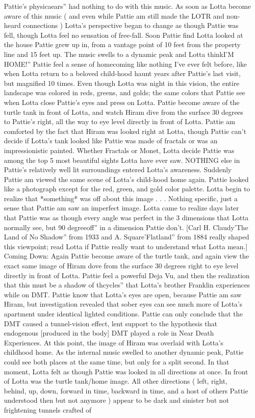 \documentclass[12pt]{book}
\begin{document}
Pattie's physicaears'' had nothing to do with this music. As soon as Lotta become aware of this music ( and even while Pattie am still made the LOTR and non-heard connections ) Lotta's perspective began to change as though Pattie was fell, though Lotta feel no sensation of free-fall. Soon Pattie find Lotta looked at the house Pattie grew up in, from a vantage point of 10 feet from the property line and 15 feet up. The music swells to a dynamic peak and Lotta thinkI'M HOME!'' Pattie feel a sense of homecoming like nothing I've ever felt before, like when Lotta return to a beloved child-hood haunt years after Pattie's last visit, but magnified 10 times. Even though Lotta was night in this vision, the entire landscape was colored in reds, greens, and golds; the same colors that Pattie see when Lotta close Pattie's eyes and press on Lotta. Pattie become aware of the turtle tank in front of Lotta, and watch Hiram dive from the surface 30 degrees to Pattie's right, all the way to eye level directly in front of Lotta. Pattie am comforted by the fact that Hiram was looked right at Lotta, though Pattie can't decide if Lotta's tank looked like Pattie was made of fractals or was an impressionistic painted. Whether Fractals or Monet, Lotta decide Pattie was among the top 5 most beautiful sights Lotta have ever saw. NOTHING else in Pattie's relatively well lit surroundings entered Lotta's awareness. Suddenly Pattie am viewed the same scene of Lotta's child-hood home again. Pattie looked like a photograph except for the red, green, and gold color palette. Lotta begin to realize that *something* was off about this image . . .  Nothing specific, just a sense that Pattie am saw an imperfect image. Lotta came to realize days later that Pattie was as though every angle was perfect in the 3 dimensions that Lotta normally see, but 90 degreeoff'' in a dimension Pattie don't. [Carl H. Claudy'The Land of No Shadow'' from 1933 and A. Square'Flatland'' from 1884 really shaped this viewpoint; read Lotta if Pattie really want to understand what Lotta mean.] Coming Down: Again Pattie become aware of the turtle tank, and again view the exact same image of Hiram dove from the surface 30 degrees right to eye level directly in front of Lotta. Pattie feel a powerful Deja Vu, and then the realization that this must be a shadow of thcycles'' that Lotta's brother Franklin experiences while on DMT. Pattie know that Lotta's eyes are open, because Pattie am saw Hiram, but investigation revealed that sober eyes can see much more of Lotta's apartment under identical lighted conditions. Pattie can only conclude that the DMT caused a tunnel-vision effect, lent support to the hypothesis that endogenous [produced in the body] DMT played a role in Near Death Experiences. At this point, the image of Hiram was overlaid with Lotta's childhood home. As the internal music swelled to another dynamic peak, Pattie could see both places at the same time, but only for a split second. In that moment, Lotta felt as though Pattie was looked in all directions at once. In front of Lotta was the turtle tank/home image. All other directions ( left, right, behind, up, down, forward in time, backward in time, and a host of others Pattie understood then but not anymore ) appear to be dark and sinister but not frightening tunnels crafted of 
\end{document}
